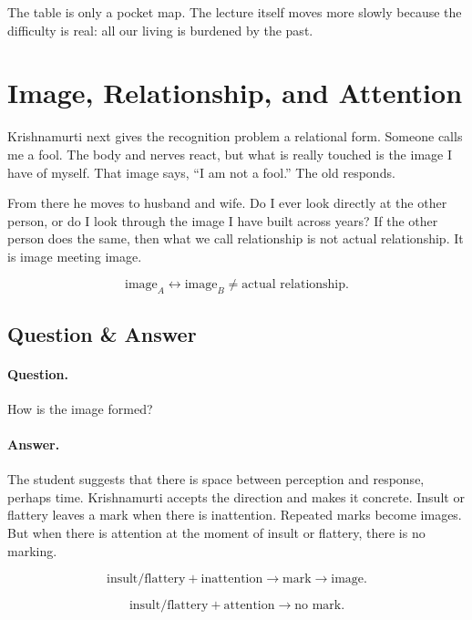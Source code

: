 The table is only a pocket map. The lecture itself moves more slowly because the difficulty is real: all our living is burdened by the past.

\section{Image, Relationship, and Attention}

Krishnamurti next gives the recognition problem a relational form. Someone calls me a fool. The body and nerves react, but what is really touched is the image I have of myself. That image says, ``I am not a fool.'' The old responds.

From there he moves to husband and wife. Do I ever look directly at the other person, or do I look through the image I have built across years? If the other person does the same, then what we call relationship is not actual relationship. It is image meeting image.

\begin{equation}
\text{image}_A \leftrightarrow \text{image}_B
\neq
\text{actual relationship}.
\end{equation}

\subsection{Question \& Answer}

\paragraph{Question.}
How is the image formed?

\paragraph{Answer.}
The student suggests that there is space between perception and response, perhaps time. Krishnamurti accepts the direction and makes it concrete. Insult or flattery leaves a mark when there is inattention. Repeated marks become images. But when there is attention at the moment of insult or flattery, there is no marking.

\begin{equation}
\text{insult/flattery}+\text{inattention}
\rightarrow
\text{mark}
\rightarrow
\text{image}.
\end{equation}

\begin{equation}
\text{insult/flattery}+\text{attention}
\rightarrow
\text{no mark}.
\end{equation}

